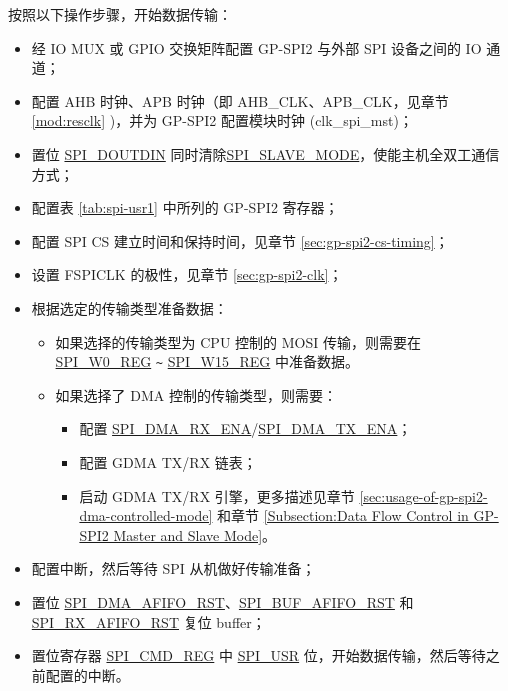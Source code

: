 \documentclass[main\_\_CN.tex]{subfiles}
\begin{document}
按照以下操作步骤，开始数据传输：
\begin{itemize}
    \item 经 IO MUX 或 GPIO 交换矩阵配置 GP-SPI2 与外部 SPI 设备之间的 IO 通道； 
    \item 配置 AHB 时钟、APB 时钟（即 AHB\_CLK、APB\_CLK，见章节 \ref{mod:resclk} \textit{})，并为 GP-SPI2 配置模块时钟 (clk\_spi\_mst)；
    \item 置位 \hyperref[fielddesc:SPIDOUTDIN]{SPI\_DOUTDIN} 同时清除\hyperref[fielddesc:SPISLAVEMODE]{SPI\_SLAVE\_MODE}，使能主机全双工通信方式；
    
    \item 配置表 \ref{tab:spi-usr1} 中所列的 GP-SPI2 寄存器；
    
    \item 配置 SPI CS 建立时间和保持时间，见章节  \ref{sec:gp-spi2-cs-timing}；
    
    \item 设置 FSPICLK 的极性，见章节  \ref{sec:gp-spi2-clk}；
    
    \item 根据选定的传输类型准备数据：
    \begin{itemize}
        \item 如果选择的传输类型为 CPU 控制的 MOSI 传输，则需要在 \hyperref[regdesc:SPIW0REG]{SPI\_W0\_REG} \verb+~+ \hyperref[regdesc:SPIW0REG]{SPI\_W15\_REG} 中准备数据。 
        
        \item 如果选择了 DMA 控制的传输类型，则需要： 
        \begin{itemize}
            \item 配置 \hyperref[fielddesc:SPIDMARXENA]{SPI\_DMA\_RX\_ENA}/\hyperref[fielddesc:SPIDMATXENA]{SPI\_DMA\_TX\_ENA}；
            \item 配置 GDMA TX/RX 链表；
            \item 启动 GDMA TX/RX 引擎，更多描述见章节  \ref{sec:usage-of-gp-spi2-dma-controlled-mode} 和章节  \ref{Subsection:Data Flow Control in GP-SPI2 Master and Slave Mode}。
        \end{itemize}
    \end{itemize}
    \item 配置中断，然后等待 SPI 从机做好传输准备；
    
    \item 置位 \hyperref[fielddesc:SPIDMAAFIFORST]{SPI\_DMA\_AFIFO\_RST}、\hyperref[fielddesc:SPIBUFAFIFORST]{SPI\_BUF\_AFIFO\_RST} 和 \hyperref[fielddesc:SPIRXAFIFORST]{SPI\_RX\_AFIFO\_RST} 复位 buffer；

    \item 置位寄存器 \hyperref[regdesc:SPICMDREG]{SPI\_CMD\_REG} 中 \hyperref[fielddesc:SPIUSR]{SPI\_USR} 位，开始数据传输，然后等待之前配置的中断。

\end{itemize}
\end{document}
